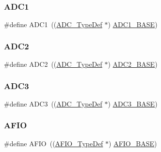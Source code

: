\subsubsection{\texorpdfstring{ADC1}{ADC1}}
{\footnotesize\ttfamily \#define A\+D\+C1~((\mbox{\hyperlink{struct_a_d_c___type_def}{A\+D\+C\+\_\+\+Type\+Def}} $\ast$) \mbox{\hyperlink{group___peripheral__memory__map_ga695c9a2f892363a1c942405c8d351b91}{A\+D\+C1\+\_\+\+B\+A\+SE}})}

\mbox{\label{group___peripheral__declaration_gac5503ae96c26b4475226f96715a1bf1e}} 
\subsubsection{\texorpdfstring{ADC2}{ADC2}}
{\footnotesize\ttfamily \#define A\+D\+C2~((\mbox{\hyperlink{struct_a_d_c___type_def}{A\+D\+C\+\_\+\+Type\+Def}} $\ast$) \mbox{\hyperlink{group___peripheral__memory__map_ga6544abc57f9759f610eee09a02442ae6}{A\+D\+C2\+\_\+\+B\+A\+SE}})}

\mbox{\label{group___peripheral__declaration_gae917784606daf6b04c9b7b96b40c2f74}} 
\subsubsection{\texorpdfstring{ADC3}{ADC3}}
{\footnotesize\ttfamily \#define A\+D\+C3~((\mbox{\hyperlink{struct_a_d_c___type_def}{A\+D\+C\+\_\+\+Type\+Def}} $\ast$) \mbox{\hyperlink{group___peripheral__memory__map_gaca766f86c8e0b00a8e2b0224dcbb4c82}{A\+D\+C3\+\_\+\+B\+A\+SE}})}

\mbox{\label{group___peripheral__declaration_ga582e09473429414015b1de90cf767fa8}} 
\subsubsection{\texorpdfstring{AFIO}{AFIO}}
{\footnotesize\ttfamily \#define A\+F\+IO~((\mbox{\hyperlink{struct_a_f_i_o___type_def}{A\+F\+I\+O\+\_\+\+Type\+Def}} $\ast$) \mbox{\hyperlink{group___peripheral__memory__map_ga5f7e3eacfcf4c313c25012795148a680}{A\+F\+I\+O\+\_\+\+B\+A\+SE}})}

